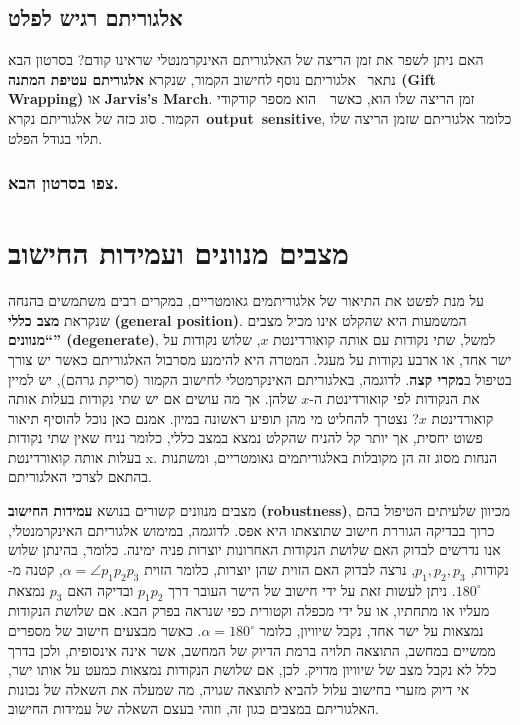 \documentclass[
]{book}
\begin{document}
\hypertarget{output-sens}{%
\subsection{אלגוריתם רגיש לפלט}\label{output-sens}}

האם ניתן לשפר את זמן הריצה של האלגוריתם האינקרמנטלי שראינו קודם? בסרטון הבא נתאר~ אלגוריתם נוסף לחישוב הקמור, שנקרא \textbf{אלגוריתם עטיפת המתנה (Gift Wrapping)} או \textbf{Jarvis's March}. זמן הריצה שלו הוא, כאשר~~הוא מספר קודקודי הקמור. סוג כזה של אלגוריתם נקרא~\textbf{output~sensitive}, כלומר אלגוריתם שזמן הריצה שלו תלוי בגודל הפלט.

\hypertarget{ux5e6ux5e4ux5d5-ux5d1ux5e1ux5e8ux5d8ux5d5ux5df-ux5d4ux5d1ux5d0.-2}{%
\subsubsection*{צפו בסרטון הבא.}\label{ux5e6ux5e4ux5d5-ux5d1ux5e1ux5e8ux5d8ux5d5ux5df-ux5d4ux5d1ux5d0.-2}}

\hypertarget{deg-robust}{%
\section{מצבים מנוונים ועמידות החישוב}\label{deg-robust}}

על מנת לפשט את התיאור של אלגוריתמים גאומטריים, במקרים רבים משתמשים בהנחה שנקראת \textbf{מצב כללי} \textbf{(general position)}. המשמעות היא שהקלט אינו מכיל מצבים \textbf{``מנוונים'' (degenerate)}, למשל, שתי נקודות עם אותה קואורדינטת \(x\), שלוש נקודות על ישר אחד, או ארבע נקודות על מעגל. המטרה היא להימנע מסרבול האלגוריתם כאשר יש צורך בטיפול ב\textbf{מקרי קצה}. לדוגמה, באלגוריתם האינקרמטלי לחישוב הקמור (סריקת גרהם), יש למיין את הנקודות לפי קואורדינטת ה-\(x\) שלהן. אך מה עושים אם יש שתי נקודות בעלות אותה קואורדינטת \(x\)? נצטרך להחליט מי מהן תופיע ראשונה במיון. אמנם כאן נוכל להוסיף תיאור פשוט יחסית, אך יותר קל להניח שהקלט נמצא במצב כללי, כלומר נניח שאין שתי נקודות בעלות אותה קואורדינטת x. הנחות מסוג זה הן מקובלות באלגוריתמים גאומטריים, ומשתנות בהתאם לצרכי האלגוריתם.

מצבים מנוונים קשורים בנושא \textbf{עמידות החישוב} \textbf{(robustness)}, מכיוון שלעיתים הטיפול בהם כרוך בבדיקה הגוררת חישוב שתוצאתו היא אפס. לדוגמה, במימוש אלגוריתם האינקרמנטלי, אנו נדרשים לבדוק האם שלושת הנקודות האחרונות יוצרות פניה ימינה. כלומר, בהינתן שלוש נקודות, \(p_1, p_2, p_3\), נרצה לבדוק האם הזוית שהן יוצרות, כלומר הזוית \(\alpha = \angle p_1 p_2 p_3\), קטנה מ- \(180^\circ\). ניתן לעשות זאת על ידי חישוב של הישר העובר דרך \(p_1 p_2\) ובדיקה האם \(p_3\) נמצאת מעליו או מתחתיו, או על ידי מכפלה וקטורית כפי שנראה בפרק הבא. אם שלושת הנקודות נמצאות על ישר אחד, נקבל שיוויון, כלומר \(\alpha= 180^\circ\). כאשר מבצעים חישוב של מספרים ממשיים במחשב, התוצאה תלויה ברמת הדיוק של המחשב, אשר אינה אינסופית, ולכן בדרך כלל לא נקבל מצב של שיוויון מדויק. לכן, אם שלושת הנקודות נמצאות כמעט על אותו ישר, אי דיוק מזערי בחישוב עלול להביא לתוצאה שגויה, מה שמעלה את השאלה של נכונות האלגוריתם במצבים כגון זה, וזוהי בעצם השאלה של עמידות החישוב.
\end{document}
